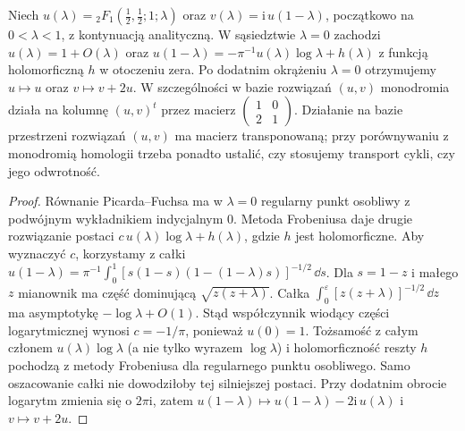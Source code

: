 \begin{stwierdzenie}
\label{prop:xv-legendre-T2}
Niech $u(\lambda)={}_2F_1(\frac12,\frac12;1;\lambda)$
oraz $v(\lambda)=\mathrm i\,u(1-\lambda)$, początkowo
na $0<\lambda<1$, z kontynuacją analityczną.
W sąsiedztwie $\lambda=0$ zachodzi
$u(\lambda)=1+O(\lambda)$ oraz
$u(1-\lambda)=-\pi^{-1}u(\lambda)\log\lambda+h(\lambda)$
z funkcją holomorficzną $h$ w otoczeniu zera.
Po dodatnim okrążeniu $\lambda=0$ otrzymujemy
$u\mapsto u$ oraz $v\mapsto v+2u$.
W szczególności w bazie rozwiązań $(u,v)$
monodromia działa na kolumnę $(u,v)^t$ przez macierz
$\left(\begin{smallmatrix}1&0\\2&1\end{smallmatrix}\right)$.
Działanie na bazie przestrzeni rozwiązań $(u,v)$
ma macierz transponowaną; przy porównywaniu z
monodromią homologii trzeba ponadto ustalić,
czy stosujemy transport cykli, czy jego odwrotność.
\end{stwierdzenie}
\begin{proof}
Równanie Picarda--Fuchsa ma w $\lambda=0$
regularny punkt osobliwy z podwójnym wykładnikiem
indycjalnym $0$. Metoda Frobeniusa daje drugie
rozwiązanie postaci $c\,u(\lambda)\log\lambda+h(\lambda)$,
gdzie $h$ jest holomorficzne.
Aby wyznaczyć $c$, korzystamy z całki
$u(1-\lambda)=\pi^{-1}\int_0^1
[s(1-s)(1-(1-\lambda)s)]^{-1/2}\,\dd s$.
Dla $s=1-z$ i małego $z$ mianownik ma część dominującą
$\sqrt{z(z+\lambda)}$. Całka
$\int_0^\varepsilon [z(z+\lambda)]^{-1/2}\,\dd z$
ma asymptotykę $-\log\lambda+O(1)$.
Stąd współczynnik wiodący części logarytmicznej wynosi
$c=-1/\pi$, ponieważ $u(0)=1$.
Tożsamość z całym członem $u(\lambda)\log\lambda$
(a nie tylko wyrazem $\log\lambda$) i holomorficzność
reszty $h$ pochodzą z metody Frobeniusa dla regularnego
punktu osobliwego. Samo oszacowanie całki nie dowodziłoby
tej silniejszej postaci.
Przy dodatnim obrocie logarytm zmienia się o $2\pi\mathrm i$,
zatem $u(1-\lambda)\mapsto u(1-\lambda)-2\mathrm i\,u(\lambda)$
i $v\mapsto v+2u$.
\end{proof}
